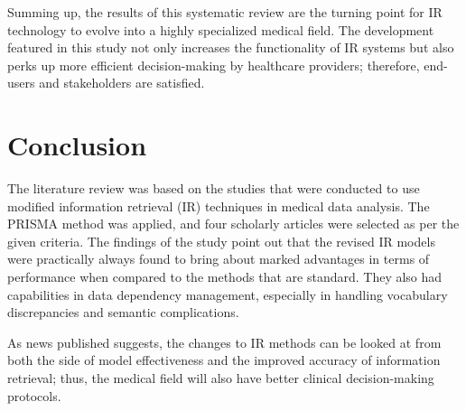 \documentclass[conference]{IEEEtran}
\begin{document}
Summing up, the results of this systematic review are the turning point for IR technology to evolve into a highly specialized medical field. The development featured in this study not only increases the functionality of IR systems but also perks up more efficient decision-making by healthcare providers; therefore, end-users and stakeholders are satisfied.

\section{Conclusion}

The literature review was based on the studies that were conducted to use modified information retrieval (IR) techniques in medical data analysis. The PRISMA method was applied, and four scholarly articles were selected as per the given criteria. The findings of the study point out that the revised IR models were practically always found to bring about marked advantages in terms of performance when compared to the methods that are standard. They also had capabilities in data dependency management, especially in handling vocabulary discrepancies and semantic complications.

As news published suggests, the changes to IR methods can be looked at from both the side of model effectiveness and the improved accuracy of information retrieval; thus, the medical field will also have better clinical decision-making protocols.



\end{document}
